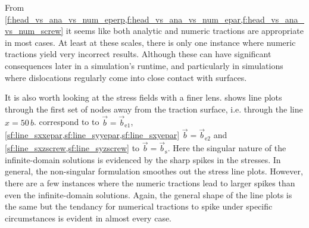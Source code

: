 \documentclass[11pt]{iopart}
\begin{document}
From \cref{f:head_vs_ana_vs_num_eperp,f:head_vs_ana_vs_num_epar,f:head_vs_ana_vs_num_screw} it seems
like both analytic and numeric tractions are appropriate in most cases. At least at these scales, there is only one instance where numeric tractions yield very incorrect results. Although these can have significant consequences later in a simulation's runtime, and particularly in simulations where dislocations regularly come into close contact with surfaces.

It is also worth looking at the stress fields with a finer lens.  shows line plots through the first set of nodes away from the traction surface, i.e. through the line $x = 50\, b$.  correspond to to $\vec{b} = \vec{b}_{\textrm{e1}}$, \cref{sf:line_sxxepar,sf:line_syyepar,sf:line_sxyepar} $\vec{b} = \vec{b}_{\textrm{e2}}$ and \cref{sf:line_sxzscrew,sf:line_syzscrew} to $\vec{b} = \vec{b}_{\textrm{s}}$. Here the singular nature of the infinite-domain solutions is evidenced by the sharp spikes in the stresses. In general, the non-singular formulation smoothes out the stress line plots. However, there are a few instances where the numeric tractions lead to larger spikes than even the infinite-domain solutions. Again, the general shape of the line plots is the same but the tendancy for numerical tractions to spike under specific circumstances is evident in almost every case.
\end{document}

